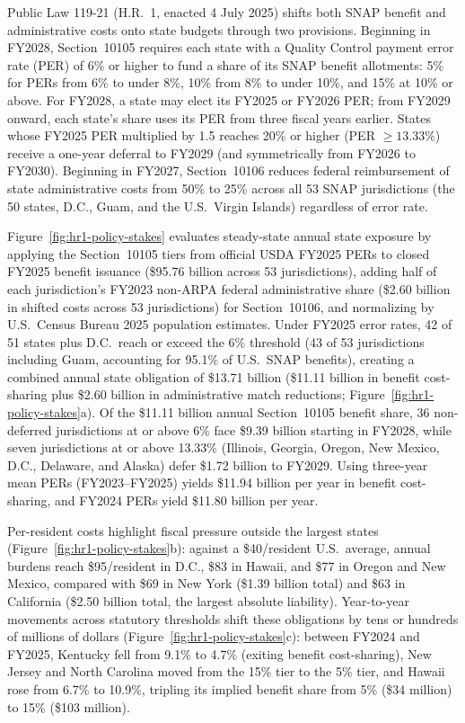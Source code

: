 \documentclass[sigconf,nonacm,screen]{acmart}
\begin{document}
Public Law 119-21 (H.R.\ 1, enacted 4 July 2025) shifts both SNAP benefit and administrative costs onto state budgets through two provisions. Beginning in FY2028, Section~10105 requires each state with a Quality Control payment error rate (PER) of 6\% or higher to fund a share of its SNAP benefit allotments: 5\% for PERs from 6\% to under 8\%, 10\% from 8\% to under 10\%, and 15\% at 10\% or above. For FY2028, a state may elect its FY2025 or FY2026 PER; from FY2029 onward, each state's share uses its PER from three fiscal years earlier. States whose FY2025 PER multiplied by 1.5 reaches 20\% or higher (PER $\ge 13.33\%$) receive a one-year deferral to FY2029 (and symmetrically from FY2026 to FY2030). Beginning in FY2027, Section~10106 reduces federal reimbursement of state administrative costs from 50\% to 25\% across all 53 SNAP jurisdictions (the 50 states, D.C., Guam, and the U.S.\ Virgin Islands) regardless of error rate.

Figure~\ref{fig:hr1-policy-stakes} evaluates steady-state annual state exposure by applying the Section~10105 tiers from official USDA FY2025 PERs to closed FY2025 benefit issuance (\$95.76 billion across 53 jurisdictions), adding half of each jurisdiction's FY2023 non-ARPA federal administrative share (\$2.60 billion in shifted costs across 53 jurisdictions) for Section~10106, and normalizing by U.S.\ Census Bureau 2025 population estimates. Under FY2025 error rates, 42 of 51 states plus D.C.\ reach or exceed the 6\% threshold (43 of 53 jurisdictions including Guam, accounting for 95.1\% of U.S.\ SNAP benefits), creating a combined annual state obligation of \$13.71 billion (\$11.11 billion in benefit cost-sharing plus \$2.60 billion in administrative match reductions; Figure~\ref{fig:hr1-policy-stakes}a). Of the \$11.11 billion annual Section~10105 benefit share, 36 non-deferred jurisdictions at or above 6\% face \$9.39 billion starting in FY2028, while seven jurisdictions at or above 13.33\% (Illinois, Georgia, Oregon, New Mexico, D.C., Delaware, and Alaska) defer \$1.72 billion to FY2029. Using three-year mean PERs (FY2023--FY2025) yields \$11.94 billion per year in benefit cost-sharing, and FY2024 PERs yield \$11.80 billion per year.

Per-resident costs highlight fiscal pressure outside the largest states (Figure~\ref{fig:hr1-policy-stakes}b): against a \$40/resident U.S.\ average, annual burdens reach \$95/resident in D.C., \$83 in Hawaii, and \$77 in Oregon and New Mexico, compared with \$69 in New York (\$1.39 billion total) and \$63 in California (\$2.50 billion total, the largest absolute liability). Year-to-year movements across statutory thresholds shift these obligations by tens or hundreds of millions of dollars (Figure~\ref{fig:hr1-policy-stakes}c): between FY2024 and FY2025, Kentucky fell from 9.1\% to 4.7\% (exiting benefit cost-sharing), New Jersey and North Carolina moved from the 15\% tier to the 5\% tier, and Hawaii rose from 6.7\% to 10.9\%, tripling its implied benefit share from 5\% (\$34 million) to 15\% (\$103 million).
\end{document}
